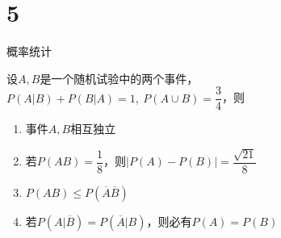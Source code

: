 \chapter{5}{概率统计}

\begin{exercise}
  设$A,B$是一个随机试验中的两个事件，$P(A|B)+P(B|A)=1,\ P(A\cup B)=\dfrac{3}{4}$，则
\begin{enumerate}[label=\Alph*.,itemsep=4pt]
    \item 事件$A,B$相互独立
    \item 若$P(AB)=\dfrac{1}{8}$，则$|P(A)-P(B)|=\dfrac{\sqrt{21}}{8}$
    \item $P(AB)\leqslant P(\overline{A}\overline{B})$
    \item 若$P(A|\overline{B})=P(\overline{A}|B)$，则必有$P(A)=P(B)$
\end{enumerate}
\end{exercise}
